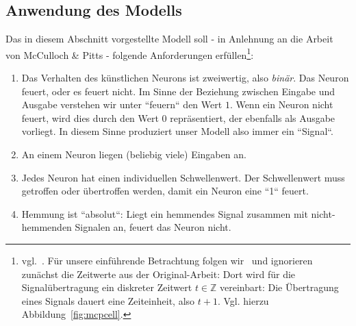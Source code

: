 \subsection{Anwendung des Modells}
Das in diesem Abschnitt vorgestellte Modell soll - in Anlehnung an die Arbeit von McCulloch \& Pitts - folgende Anforderungen erfüllen\footnote{
    vgl.~\cite[26 f.]{Fau94}. Für unsere einführende Betrachtung folgen wir~\cite[33 f.]{Roj93} und ignorieren zunächst die Zeitwerte aus der Original-Arbeit: Dort wird für die Signalübertragung ein diskreter Zeitwert $t \in \mathbb{Z}$ vereinbart: Die Übertragung eines Signals dauert eine Zeiteinheit, also $t + 1$. Vgl. hierzu Abbildung~\ref{fig:mcpcell}.
}:
\begin{enumerate}
    \item Das Verhalten des künstlichen Neurons ist zweiwertig, also \textit{binär}. Das Neuron feuert, oder es feuert nicht. Im Sinne der Beziehung zwischen Eingabe und Ausgabe verstehen wir unter ``feuern`` den Wert $1$. Wenn ein Neuron nicht feuert, wird dies durch den Wert $0$ repräsentiert, der ebenfalls als Ausgabe vorliegt. In diesem Sinne produziert unser Modell also immer ein ``Signal``.
    \item An einem Neuron liegen (beliebig viele) Eingaben an.
    \item {
        Jedes Neuron hat einen individuellen Schwellenwert.
        Der Schwellenwert muss getroffen oder übertroffen werden, damit ein Neuron eine ``1`` feuert.
    }
    \item Hemmung ist ``absolut``: Liegt ein hemmendes Signal zusammen mit nicht-hemmenden Signalen an, feuert das Neuron nicht.
\end{enumerate}


